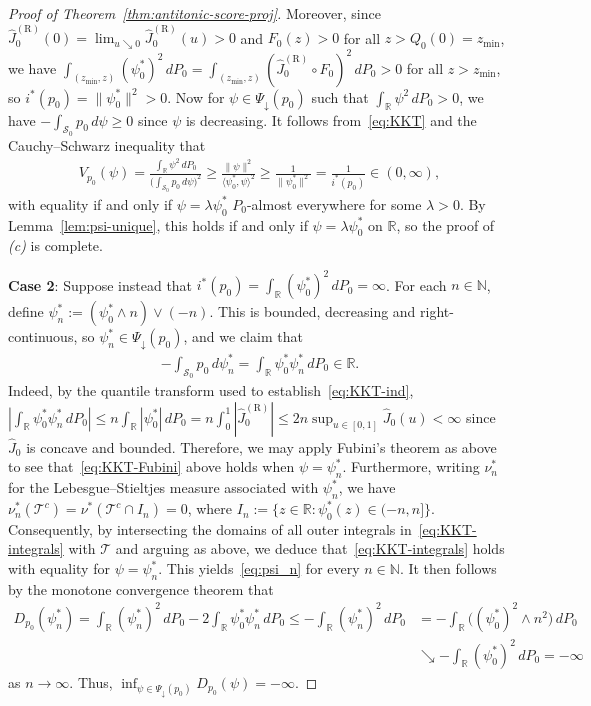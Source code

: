 \documentclass[a4paper]{article}
\newcommand{\N}{\mathbb{N}}
\newcommand{\R}{\mathbb{R}}
\newcommand{\norm}[1]{\|{#1}\|}
\newcommand{\ipr}[2]{\langle #1, #2 \rangle}
\theoremstyle{definition}
\begin{document}
\begin{proof}[Proof of Theorem~\ref{thm:antitonic-score-proj}]
Moreover, since $\hat{J}_0^{(\mathrm{R})}(0) = \lim_{u \searrow 0}\hat{J}_0^{(\mathrm{R})}(u) > 0$ and $F_0(z) > 0$ for all $z > Q_0(0) = z_{\min}$, we have $\int_{(z_{\min},z)}(\psi_0^*)^2\,dP_0 = \int_{(z_{\min},z)}(\hat{J}_0^{(\mathrm{R})} \circ F_0)^2\,dP_0 > 0$ for all $z > z_{\min}$, so $i^*(p_0) = \norm{\psi_0^*}^2 > 0$. Now for $\psi \in \Psi_\downarrow(p_0)$ such that $\int_\R\psi^2\,dP_0 > 0$, we have $-\int_{\mathcal{S}_0} p_0\,d\psi \geq 0$ since $\psi$ is decreasing. It follows from~\eqref{eq:KKT} and the Cauchy--Schwarz inequality that
\begin{align*}
V_{p_0}(\psi) = \frac{\int_\R\psi^2\,dP_0}{\bigl(\int_{\mathcal{S}_0} p_0\,d\psi\bigr)^2} \geq \frac{\norm{\psi}^2}{\ipr{\psi_0^*}{\psi}^2} \geq \frac{1}{\norm{\psi_0^*}^2} = \frac{1}{i^*(p_0)} \in (0,\infty),
\end{align*}
with equality if and only if $\psi = \lambda\psi_0^*$ $P_0$-almost everywhere for some $\lambda > 0$. By Lemma~\ref{lem:psi-unique}, this holds if and only if $\psi = \lambda\psi_0^*$ on $\R$, so the proof of \emph{(c)} is complete.

\medskip
\noindent
\textbf{Case 2}: Suppose instead that $i^*(p_0) = \int_\R (\psi_0^*)^2\,dP_0 = \infty$. For each $n \in \N$, define $\psi_n^* := (\psi_0^* \wedge n) \vee (-n)$. This is bounded, decreasing and right-continuous, so $\psi_n^* \in \Psi_\downarrow(p_0)$, and we claim that
\begin{align}
\label{eq:psi_n}
-\int_{\mathcal{S}_0} p_0\,d\psi_n^* = \int_\R\psi_0^*\psi_n^*\,dP_0  \in \R.
\end{align}
Indeed, by the quantile transform used to establish~\eqref{eq:KKT-ind}, $|\int_\R\psi_0^*\psi_n^*\,dP_0| \leq n\int_\R|\psi_0^*|\,dP_0 = n\int_0^1|\hat{J}_0^{(\mathrm{R})}| \leq 2n\sup_{u \in [0,1]}\hat{J}_0(u) < \infty$ since $\hat{J}_0$ is concave and bounded. Therefore, we may apply Fubini's theorem as above to see that~\eqref{eq:KKT-Fubini} above holds when $\psi = \psi_n^*$. Furthermore, writing $\nu_n^*$ for the Lebesgue--Stieltjes measure associated with $\psi_n^*$, we have $\nu_n^*(\mathcal{T}^c) = \nu^*(\mathcal{T}^c\cap I_n) = 0$, where $I_n := \{z \in \R : \psi_0^*(z) \in (-n,n]\}$.
Consequently, by intersecting the domains of all outer integrals in~\eqref{eq:KKT-integrals} with $\mathcal{T}$ and arguing as above, we deduce that~\eqref{eq:KKT-integrals} holds with equality for $\psi = \psi_n^*$. This yields~\eqref{eq:psi_n} for every $n \in \N$. It then follows by the monotone convergence theorem that
\begin{align*}
D_{p_0}(\psi_n^*) = \int_\R(\psi_n^*)^2\,dP_0 - 2\int_\R\psi_0^*\psi_n^*\,dP_0 \leq -\int_\R(\psi_n^*)^2\,dP_0 &= -\int_\R\bigl((\psi_0^*)^2\wedge n^2\bigr)\,dP_0 \\
&\searrow -\int_\R(\psi_0^*)^2\,dP_0 = -\infty
\end{align*}
as $n \to \infty$. Thus, $\inf_{\psi \in \Psi_\downarrow(p_0)}D_{p_0}(\psi) = -\infty$. 


\end{proof}
\end{document}
